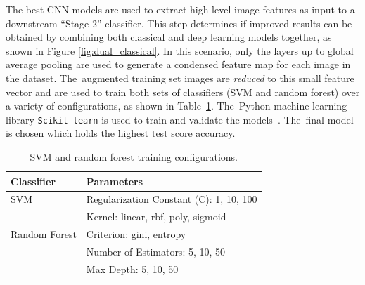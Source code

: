 The best \ac{CNN} models are used to extract high level image features as input to a downstream ``Stage    2'' classifier.  This step determines if improved results can be obtained by combining both classical and deep learning models together, as shown in Figure \ref{fig:dual_classical}.  In this scenario, only the layers up to global average pooling are used to generate a condensed feature map for each image in the dataset.  The~augmented training set images are \emph{reduced} to this small feature vector and are used to train both sets of classifiers (SVM and random forest) over a variety of configurations, as shown in Table~\ref{table:classic_params}. The~Python machine learning library \texttt{Scikit-learn} is used to train and validate the models~\cite{pedregosa_scikit-learn_2011}. The~final model is chosen which holds the highest test score accuracy.


\begin{table}[H]
\caption{SVM and random forest training configurations.}\label{table:classic_params}
\centering
\begin{tabular}{@{}ll@{}}
\toprule
\textbf{Classifier}     & \textbf{Parameters }                     \\ \midrule
SVM            & Regularization Constant (C): 1, 10, 100                     \\
              & Kernel: linear, rbf, poly, sigmoid \\
              \midrule
Random Forest  & Criterion: gini, entropy        \\
              & Number of Estimators: 5, 10, 50         \\
              & Max Depth: 5, 10, 50              \\ \bottomrule
\end{tabular}
\end{table}
\unskip

